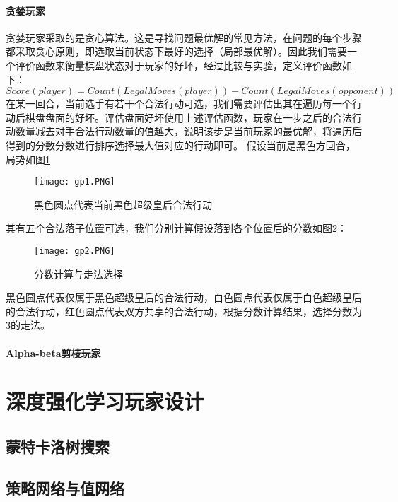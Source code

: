 \paragraph{贪婪玩家}
贪婪玩家采取的是贪心算法\cite{introAlgo}。这是寻找问题最优解的常见方法，在问题的每个步骤都采取贪心原则，即选取当前状态下最好的选择（局部最优解）。因此我们需要一个评价函数来衡量棋盘状态对于玩家的好坏，经过比较与实验，定义评价函数如下：
\begin{equation}
    Score(player) = Count(LegalMoves(player)) - Count(LegalMoves(opponent))
\end{equation}
在某一回合，当前选手有若干个合法行动可选，我们需要评估出其在遍历每一个行动后棋盘盘面的好坏。评估盘面好坏使用上述评估函数，玩家在一步之后的合法行动数量减去对手合法行动数量的值越大，说明该步是当前玩家的最优解，将遍历后得到的分数分数进行排序选择最大值对应的行动即可。
假设当前是黑色方回合，局势如图\ref{fig:gp1}
\begin{figure}[H]
    \centering
    \texttt{[image: gp1.PNG]}
    \caption[gp1]{%
        黑色圆点代表当前黑色超级皇后合法行动%
      }
    \label{fig:gp1}
\end{figure}
其有五个合法落子位置可选，我们分别计算假设落到各个位置后的分数如图\ref{fig:gp2}：
\begin{figure}[H]
    \centering
    \texttt{[image: gp2.PNG]}
    \caption[gp2]{%
        分数计算与走法选择%
      }
    \label{fig:gp2}
\end{figure}
黑色圆点代表仅属于黑色超级皇后的合法行动，白色圆点代表仅属于白色超级皇后的合法行动，红色圆点代表双方共享的合法行动，根据分数计算结果，选择分数为3的走法。
\paragraph{Alpha-beta剪枝玩家}

\section{深度强化学习玩家设计}

\subsection{蒙特卡洛树搜索}

\subsection{策略网络与值网络}